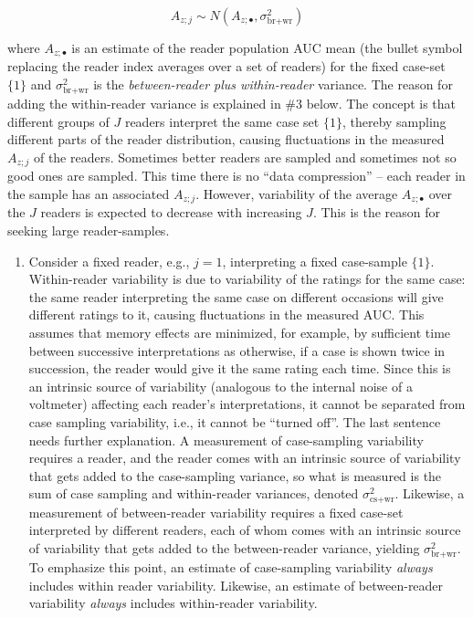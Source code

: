 \documentclass[
]{book}
\providecommand{\tightlist}{%
  \setlength{\itemsep}{0pt}\setlength{\parskip}{0pt}}
\begin{document}
\begin{equation} 
A_{z;j}\sim N(A_{z;\bullet},\sigma_{\text{br+wr}}^2)
\label{eq:sources-of-variability-br-wr}
\end{equation}

where \(A_{z;\bullet}\) is an estimate of the reader population AUC mean (the bullet symbol replacing the reader index averages over a set of readers) for the fixed case-set \(\{1\}\) and \(\sigma_{\text{br+wr}}^2\) is the \emph{between-reader plus within-reader} variance. The reason for adding the within-reader variance is explained in \#3 below. The concept is that different groups of \(J\) readers interpret the same case set \(\{1\}\), thereby sampling different parts of the reader distribution, causing fluctuations in the measured \(A_{z;j}\) of the readers. Sometimes better readers are sampled and sometimes not so good ones are sampled. This time there is no ``data compression'' -- each reader in the sample has an associated \(A_{z;j}\). However, variability of the average \(A_{z;\bullet}\) over the \(J\) readers is expected to decrease with increasing \(J\). This is the reason for seeking large reader-samples.

\begin{enumerate}
\def\labelenumi{\arabic{enumi}.}
\setcounter{enumi}{2}
\tightlist
\item
  Consider a fixed reader, e.g., \(j = 1\), interpreting a fixed case-sample \(\{1\}\). Within-reader variability is due to variability of the ratings for the same case: the same reader interpreting the same case on different occasions will give different ratings to it, causing fluctuations in the measured AUC. This assumes that memory effects are minimized, for example, by sufficient time between successive interpretations as otherwise, if a case is shown twice in succession, the reader would give it the same rating each time. Since this is an intrinsic source of variability (analogous to the internal noise of a voltmeter) affecting each reader's interpretations, it cannot be separated from case sampling variability, i.e., it cannot be ``turned off''. The last sentence needs further explanation. A measurement of case-sampling variability requires a reader, and the reader comes with an intrinsic source of variability that gets added to the case-sampling variance, so what is measured is the sum of case sampling and within-reader variances, denoted \(\sigma_{\text{cs+wr}}^2\). Likewise, a measurement of between-reader variability requires a fixed case-set interpreted by different readers, each of whom comes with an intrinsic source of variability that gets added to the between-reader variance, yielding \(\sigma_{\text{br+wr}}^2\). To emphasize this point, an estimate of case-sampling variability \emph{always} includes within reader variability. Likewise, an estimate of between-reader variability \emph{always} includes within-reader variability.
\end{enumerate}
\end{document}
